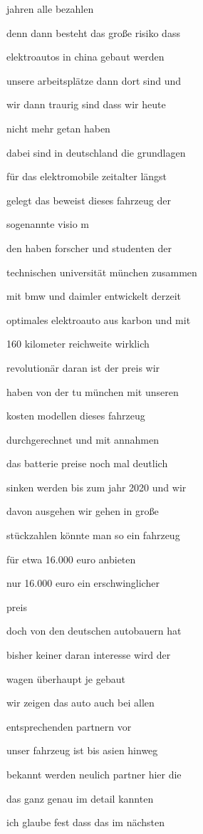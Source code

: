 \documentclass[a4paper, 11pt]{book} %
\begin{document}
jahren alle bezahlen

denn dann besteht das große risiko dass

elektroautos in china gebaut werden

unsere arbeitsplätze dann dort sind und

wir dann traurig sind dass wir heute

nicht mehr getan haben

dabei sind in deutschland die grundlagen

für das elektromobile zeitalter längst

gelegt das beweist dieses fahrzeug der

sogenannte visio m

den haben forscher und studenten der

technischen universität münchen zusammen

mit bmw und daimler entwickelt derzeit

optimales elektroauto aus karbon und mit

160 kilometer reichweite wirklich

revolutionär daran ist der preis wir

haben von der tu münchen mit unseren

kosten modellen dieses fahrzeug

durchgerechnet und mit annahmen

das batterie preise noch mal deutlich

sinken werden bis zum jahr 2020 und wir

davon ausgehen wir gehen in große

stückzahlen könnte man so ein fahrzeug

für etwa 16.000 euro anbieten

nur 16.000 euro ein erschwinglicher

preis

doch von den deutschen autobauern hat

bisher keiner daran interesse wird der

wagen überhaupt je gebaut

wir zeigen das auto auch bei allen

entsprechenden partnern vor

unser fahrzeug ist bis asien hinweg

bekannt werden neulich partner hier die

das ganz genau im detail kannten

ich glaube fest dass das im nächsten
\end{document}
